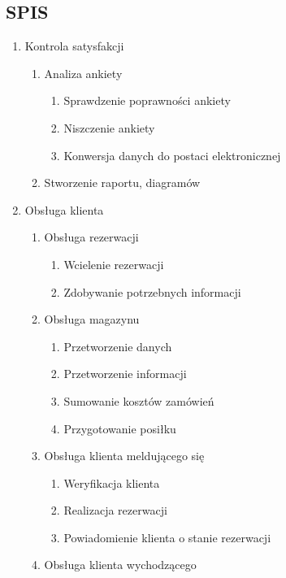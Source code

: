 \documentclass[a4paper, 11pt]{article}
\begin{document}
	\subsection{SPIS}
	\begin{enumerate}[label*=\arabic*.]
		\item Kontrola satysfakcji
		\begin{enumerate}[label*=\arabic*.]
			\item Analiza ankiety
			\begin{enumerate}[label*=\arabic*.]
				\item Sprawdzenie poprawności ankiety
				\item Niszczenie ankiety
				\item Konwersja danych do postaci elektronicznej
			\end{enumerate}
			\item Stworzenie raportu, diagramów
		\end{enumerate}
		\item Obsługa klienta
		\begin{enumerate}[label*=\arabic*.]
			\item Obsługa rezerwacji
			\begin{enumerate}[label*=\arabic*.]
				\item Wcielenie rezerwacji
				\item Zdobywanie potrzebnych informacji
			\end{enumerate}
			\item Obsługa magazynu
			\begin{enumerate}[label*=\arabic*.]
				\item Przetworzenie danych
				\item Przetworzenie informacji
				\item Sumowanie kosztów zamówień
				\item Przygotowanie posiłku
			\end{enumerate}						
			\item Obsługa klienta meldującego się 
			\begin{enumerate}[label*=\arabic*.]
				\item Weryfikacja klienta
				\item Realizacja rezerwacji
				\item Powiadomienie klienta o stanie rezerwacji
			\end{enumerate}									
			\item Obsługa klienta wychodzącego
			\begin{enumerate}[label*=\arabic*.]

\end{enumerate}
\end{enumerate}
\end{enumerate}
\end{document}
